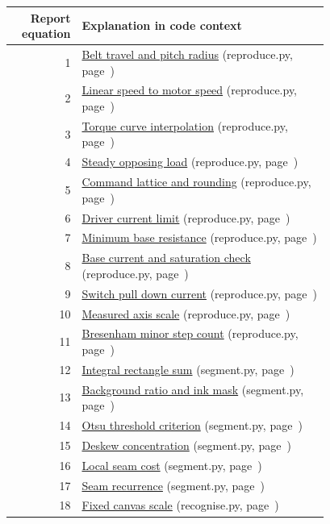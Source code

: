 \begin{longtable}{rp{0.78\linewidth}}\toprule Report equation & Explanation in code context\\\midrule\endhead
1 & \hyperref[report-eq:1]{Belt travel and pitch radius} (reproduce.py, page~\pageref{report-eq:1})\\
2 & \hyperref[report-eq:2]{Linear speed to motor speed} (reproduce.py, page~\pageref{report-eq:2})\\
3 & \hyperref[report-eq:3]{Torque curve interpolation} (reproduce.py, page~\pageref{report-eq:3})\\
4 & \hyperref[report-eq:4]{Steady opposing load} (reproduce.py, page~\pageref{report-eq:4})\\
5 & \hyperref[report-eq:5]{Command lattice and rounding} (reproduce.py, page~\pageref{report-eq:5})\\
6 & \hyperref[report-eq:6]{Driver current limit} (reproduce.py, page~\pageref{report-eq:6})\\
7 & \hyperref[report-eq:7]{Minimum base resistance} (reproduce.py, page~\pageref{report-eq:7})\\
8 & \hyperref[report-eq:8]{Base current and saturation check} (reproduce.py, page~\pageref{report-eq:8})\\
9 & \hyperref[report-eq:9]{Switch pull down current} (reproduce.py, page~\pageref{report-eq:9})\\
10 & \hyperref[report-eq:10]{Measured axis scale} (reproduce.py, page~\pageref{report-eq:10})\\
11 & \hyperref[report-eq:11]{Bresenham minor step count} (reproduce.py, page~\pageref{report-eq:11})\\
12 & \hyperref[report-eq:12]{Integral rectangle sum} (segment.py, page~\pageref{report-eq:12})\\
13 & \hyperref[report-eq:13]{Background ratio and ink mask} (segment.py, page~\pageref{report-eq:13})\\
14 & \hyperref[report-eq:14]{Otsu threshold criterion} (segment.py, page~\pageref{report-eq:14})\\
15 & \hyperref[report-eq:15]{Deskew concentration} (segment.py, page~\pageref{report-eq:15})\\
16 & \hyperref[report-eq:16]{Local seam cost} (segment.py, page~\pageref{report-eq:16})\\
17 & \hyperref[report-eq:17]{Seam recurrence} (segment.py, page~\pageref{report-eq:17})\\
18 & \hyperref[report-eq:18]{Fixed canvas scale} (recognise.py, page~\pageref{report-eq:18})\\

\end{longtable}
